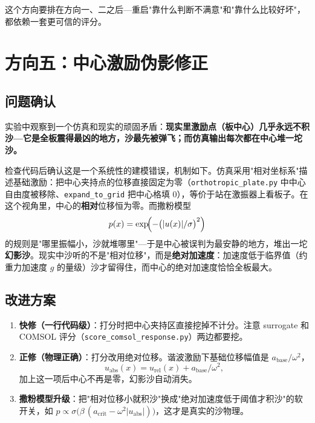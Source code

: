 \documentclass[11pt,a4paper]{article}
\newcommand{\code}[1]{\texttt{#1}}
\begin{document}
这个方向要排在方向一、二之后---重启"靠什么判断不满意"和"靠什么比较好坏"，都依赖一套更可信的评分。

\section{方向五：中心激励伪影修正}

\subsection{问题确认}

实验中观察到一个仿真和现实的顽固矛盾：\textbf{现实里激励点（板中心）几乎永远不积沙---它是全板震得最凶的地方，沙最先被弹飞；而仿真输出每次都在中心堆一坨沙。}

检查代码后确认这是一个系统性的建模错误，机制如下。仿真采用"相对坐标系"描述基础激励：把中心夹持点的位移直接固定为零（\code{orthotropic\_plate.py} 中中心自由度被移除、\code{expand\_to\_grid} 把中心格填 0），等价于站在激振器上看板子。在这个视角里，中心的\textbf{相对}位移恒为零。而撒粉模型
\begin{equation}
p(x) = \exp\!\Bigl(-\bigl(|u(x)|/\sigma\bigr)^2\Bigr)
\end{equation}
的规则是"哪里振幅小，沙就堆哪里"---于是中心被误判为最安静的地方，堆出一坨\textbf{幻影沙}。现实中沙听的不是"相对位移"，而是\textbf{绝对加速度}：加速度低于临界值（约重力加速度 $g$ 的量级）沙才留得住，而中心的绝对加速度恰恰全板最大。

\subsection{改进方案}

\begin{enumerate}[leftmargin=2em]
\item \textbf{快修（一行代码级）}：打分时把中心夹持区直接挖掉不计分。注意 surrogate 和 COMSOL 评分（\code{score\_comsol\_response.py}）两边都要挖。
\item \textbf{正修（物理正确）}：打分改用绝对位移。谐波激励下基础位移幅值是 $a_{\mathrm{base}}/\omega^2$，
\begin{equation}
u_{\mathrm{abs}}(x) = u_{\mathrm{rel}}(x) + a_{\mathrm{base}}/\omega^{2},
\end{equation}
加上这一项后中心不再是零，幻影沙自动消失。
\item \textbf{撒粉模型升级}：把"相对位移小就积沙"换成"绝对加速度低于阈值才积沙"的软开关，如 $p \propto \sigma\!\bigl(\beta\,(a_{\mathrm{crit}}-\omega^2|u_{\mathrm{abs}}|)\bigr)$，这才是真实的沙物理。
\end{enumerate}
\end{document}
